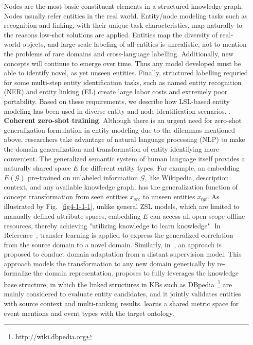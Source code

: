 \label{sec4.1.1}
Nodes are the most basic constituent elements in a structured knowledge graph.  Nodes usually refer entities in the real world. Entity/node modeling tasks such as recognition and linking, with their unique task characteristics, map naturally to the reasons low-shot solutions are applied. Entities map the diversity of real-world objects, and large-scale labeling of all entities is unrealistic, not to mention the problems of rare domains and cross-language labelling. Additionally, new concepts will continue to emerge over time. Thus any model developed must be able to identify novel, as yet unseen entities. Finally, structured labelling requried for some  multi-step entity identification tasks, such as named entity recognition (NER) and entity linking (EL) create large labor costs and extremely poor portability.
Based on these requirements, we describe how LSL-based entity modeling has been used in diverse entity and node identification scenarios.
\uppercase\expandafter{}. \textbf{Coherent zero-shot training}. Although there is an urgent need for zero-shot generalization formulation in entity modeling due to the dilemmas mentioned above, researchers take advantage of natural language processing (NLP) to make the domain generalization and transformation of entity identifying more convenient. The generalized semantic system of human language itself provides a naturally shared space $E$ for different entity types. For example, an embedding $E (\mathcal{G})$ pre-trained on unlabeled information $\mathcal{G}$, like Wikipedia, description context, and any available knowledge graph, has the generalization function of concept transformation from seen entities $x_{src}$ to unseen entities $x_{tgt}$. As illustrated by Fig.~\ref{fig4-1-1-1}, unlike general ZSL models, which are limited to manually defined attribute spaces, embedding $E$ can access all open-scope offline resources, thereby achieving "utilizing knowledge to learn knowledge". In Reference~, transfer learning is applied to express the generalized correlation from the source domain to a novel domain. Similarly, in~, an approach is proposed to conduct domain adaptation from a distant supervision model. This approach models the transformation to any new domain generically by re-formalize the domain representation.  proposes to fully leverages the knowledge base structure, in which the linked structures in KBs such as DBpedia~\footnote{http://wiki.dbpedia.org} are mainly considered to evaluate entity candidates, and it jointly validates entities with source context and multi-ranking results.  learns a shared metric space for event mentions and event types with the target ontology.
